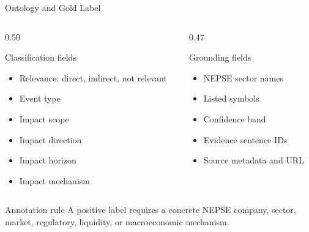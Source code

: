\documentclass[aspectratio=169,11pt,hyperref={bookmarks=false}]{beamer}
\newcommand{\smallsep}{\vspace{0.35em}}
\begin{document}
\begin{frame}{Ontology and Gold Label}
  \begin{columns}[T]
    \begin{column}{0.50\textwidth}
      \begin{block}{Classification fields}
        \begin{itemize}
          \item Relevance: direct, indirect, not relevant
          \item Event type
          \item Impact scope
          \item Impact direction
          \item Impact horizon
          \item Impact mechanism
        \end{itemize}
      \end{block}
    \end{column}
    \begin{column}{0.47\textwidth}
      \begin{block}{Grounding fields}
        \begin{itemize}
          \item NEPSE sector names
          \item Listed symbols
          \item Confidence band
          \item Evidence sentence IDs
          \item Source metadata and URL
        \end{itemize}
      \end{block}
    \end{column}
  \end{columns}
  \smallsep
  \begin{block}{Annotation rule}
    A positive label requires a concrete NEPSE company, sector, market, regulatory, liquidity, or macroeconomic mechanism.
  \end{block}
\end{frame}
\end{document}
